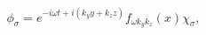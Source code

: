 \begin{equation}
\phi_{\sigma} = e^{ - i \omega t + i (k_y y + k_z z)} 
f_{\omega k_y k_z}(x) \chi_{\sigma},
\end{equation} 

